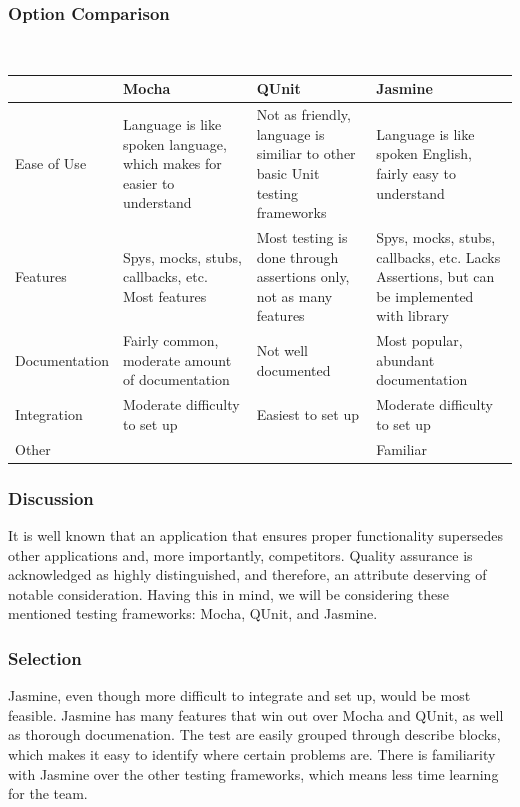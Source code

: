\documentclass[onecolumn, draftclsnofoot,10pt, compsoc]{IEEEtran}
\begin{document}
{%

\newpage
\subsubsection{Option Comparison} ~\\
\tablehead{}
\begin{supertabular}{|p{2.5cm}|p{4.5cm}|p{4.5cm}|p{4.5cm}|}
\hline
	& Mocha
	& QUnit
	& Jasmine\\ 
\hline
	Ease of Use
	& Language is like spoken language, which makes for easier to understand
	& Not as friendly, language is similiar to other basic Unit testing frameworks 	
	& Language is like spoken English, fairly easy to understand\\ 
\hline
	Features 
	& Spys, mocks, stubs, callbacks, etc. Most features 
	& Most testing is done through assertions only, not as many features 
	& Spys, mocks, stubs, callbacks, etc. Lacks Assertions, but can be implemented with library\\ 
\hline
	Documentation 
	& Fairly common, moderate amount of documentation 
	& Not well documented 
	& Most popular, abundant documentation \\ 
\hline
	Integration 
	& Moderate difficulty to set up 
	& Easiest to set up 
	& Moderate difficulty to set up\\ 
\hline
	Other 
	& 
	& 
	& Familiar\\ 
\hline
\end{supertabular}

\medskip

\subsubsection{Discussion} 
\noindent It is well known that an application that ensures proper functionality supersedes other applications and,
more importantly, competitors. Quality assurance is acknowledged as highly distinguished, and therefore,
an attribute deserving of notable consideration. Having this in mind, we will be considering these mentioned
testing frameworks: Mocha, QUnit, and Jasmine.


\subsubsection{Selection}
\noindent Jasmine, even though more difficult to integrate and set up, would be most feasible. Jasmine has many features that win
out over Mocha and QUnit, as well as thorough documenation. The test are easily grouped through describe blocks, which makes it easy
to identify where certain problems are. There is familiarity with Jasmine over the other testing frameworks, which means less time learning
for the team.

}
\end{document}
